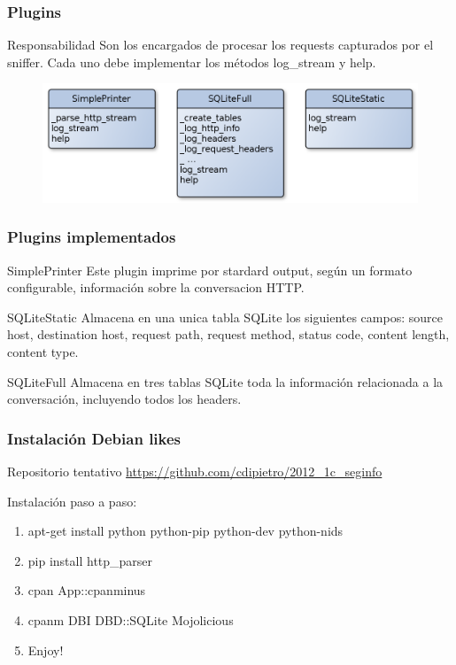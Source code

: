 \documentclass[10pt,a4paper]{beamer}
\begin{document}
\begin{frame}

	\frametitle{Plugins}
	\begin{block}{Responsabilidad}
		Son los encargados de procesar los requests capturados por el sniffer. Cada uno debe implementar los métodos log\_stream y help. 
	\end{block}
	\begin{figure}[hbtp]
		\includegraphics[scale=0.30]{img/Plugins.png} 
	\end{figure}
		
\end{frame}

\begin{frame}

	\frametitle{Plugins implementados}
	\begin{block}{SimplePrinter}
		Este plugin imprime por stardard output, según un formato configurable, información sobre la conversacion HTTP.
	\end{block}
	\begin{block}{SQLiteStatic}
		Almacena en una unica tabla SQLite los siguientes campos: source host, destination host, request path, request method, status code, content length, content type.
	\end{block}
	\begin{block}{SQLiteFull}
		Almacena en tres tablas SQLite toda la información relacionada a la conversación, incluyendo todos los headers.
	\end{block}

\end{frame}

\begin{frame}
	\frametitle{Instalación Debian likes}
	\begin{block}{Repositorio tentativo}
		\url{https://github.com/cdipietro/2012\_1c\_seginfo}	
	\end{block}
	Instalación paso a paso:
	\begin{enumerate}
		\item apt-get install python python-pip python-dev python-nids
		\item pip install http\_parser
		\item cpan App::cpanminus
		\item cpanm DBI DBD::SQLite Mojolicious
		\item Enjoy!	
	\end{enumerate}
	
\end{frame}
\end{document}

